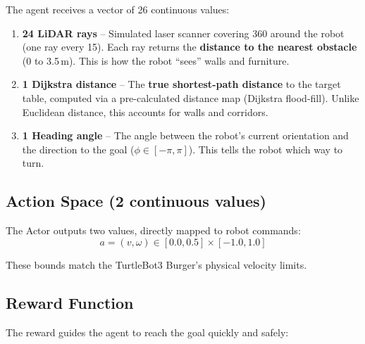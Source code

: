 \documentclass[12pt, a4paper]{article}
\begin{document}
\begin{tcolorbox}[colback=lightblue, colframe=primaryblue, title=\textbf{What the robot ``sees'' at each step (26 numbers)}]
The agent receives a vector of 26 continuous values:

\begin{enumerate}
  \item \textbf{24 LiDAR rays} -- Simulated laser scanner covering 360\textdegree{} around the robot (one ray every 15\textdegree{}). Each ray returns the \textbf{distance to the nearest obstacle} (0 to 3.5\,m). This is how the robot ``sees'' walls and furniture.

  \item \textbf{1 Dijkstra distance} -- The \textbf{true shortest-path distance} to the target table, computed via a pre-calculated distance map (Dijkstra flood-fill). Unlike Euclidean distance, this accounts for walls and corridors.

  \item \textbf{1 Heading angle} -- The angle between the robot's current orientation and the direction to the goal ($\phi \in [-\pi, \pi]$). This tells the robot which way to turn.
\end{enumerate}
\end{tcolorbox}

\subsection{Action Space (2 continuous values)}

The Actor outputs two values, directly mapped to robot commands:
\begin{equation}
a = (v, \omega) \in [0.0, 0.5] \times [-1.0, 1.0]
\end{equation}

These bounds match the TurtleBot3 Burger's physical velocity limits.

\subsection{Reward Function}
\label{sec:reward}

The reward guides the agent to reach the goal quickly and safely:
\end{document}
